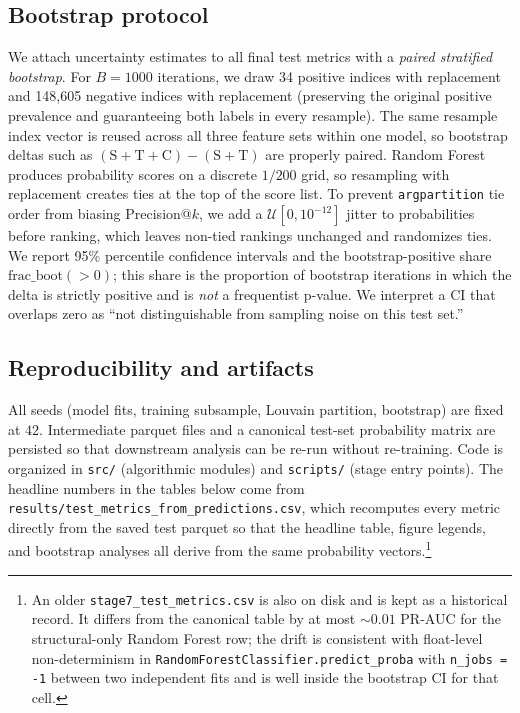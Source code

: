 \documentclass[conference]{IEEEtran}
\newcommand{\code}[1]{\texttt{#1}}
\begin{document}
\subsection{Bootstrap protocol}
We attach uncertainty estimates to all final test metrics with a
\emph{paired stratified bootstrap}. For $B = 1000$ iterations, we draw
34 positive indices with replacement and 148{,}605 negative indices
with replacement (preserving the original positive prevalence and
guaranteeing both labels in every resample). The same resample index
vector is reused across all three feature sets within one model, so
bootstrap deltas such as
$(\mathrm{S}{+}\mathrm{T}{+}\mathrm{C}) - (\mathrm{S}{+}\mathrm{T})$
are properly paired. Random Forest produces probability scores on a
discrete $1/200$ grid, so resampling with replacement creates ties at
the top of the score list. To prevent \code{argpartition} tie order
from biasing Precision@$k$, we add a $\mathcal{U}[0, 10^{-12}]$ jitter
to probabilities before ranking, which leaves non-tied rankings
unchanged and randomizes ties. We report 95\% percentile confidence
intervals and the bootstrap-positive share $\mathrm{frac\_boot}(>0)$;
this share is the proportion of bootstrap iterations in which the
delta is strictly positive and is \emph{not} a frequentist p-value.
We interpret a CI that overlaps zero as ``not distinguishable from
sampling noise on this test set.''

\subsection{Reproducibility and artifacts}
All seeds (model fits, training subsample, Louvain partition,
bootstrap) are fixed at $42$. Intermediate parquet files and a
canonical test-set probability matrix are persisted so that
downstream analysis can be re-run without re-training. Code is
organized in \code{src/} (algorithmic modules) and \code{scripts/}
(stage entry points). The headline numbers in the tables below come
from \code{results/test\_metrics\_from\_predictions.csv}, which
recomputes every metric directly from the saved test parquet so that
the headline table, figure legends, and bootstrap analyses all derive
from the same probability vectors.\footnote{An older
\code{stage7\_test\_metrics.csv} is also on disk and is kept as a
historical record. It differs from the canonical table by at most
$\sim 0.01$ PR-AUC for the structural-only Random Forest row; the
drift is consistent with float-level non-determinism in
\code{RandomForestClassifier.predict\_proba} with \code{n\_jobs = -1}
between two independent fits and is well inside the bootstrap CI for
that cell.}
\end{document}

